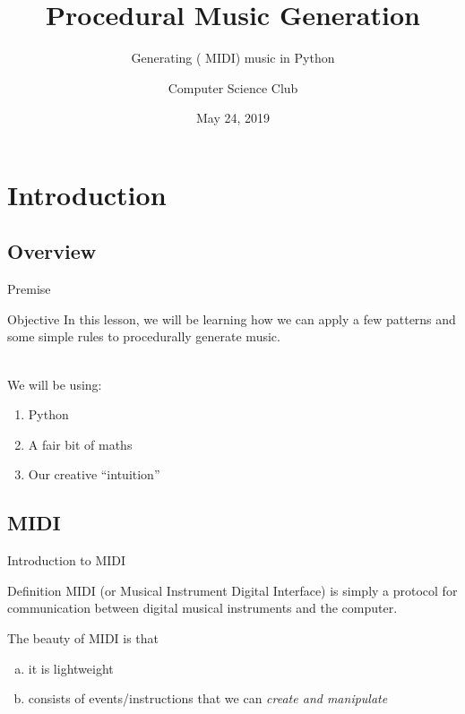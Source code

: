 \documentclass{beamer}
\title{Procedural Music Generation}
\subtitle{Generating (\censor{shitty} MIDI) music in Python}
\institute{Stephen Lewis Secondary School}
\author{Computer Science Club}
\date{May 24, 2019}
\begin{document}
\begin{frame} 
\titlepage 
\end{frame}

\section{Introduction}
\subsection{Overview}
\begin{frame}{Premise}
\end{frame}

\begin{frame}{Objective}
In this lesson, we will be learning how we can apply a few patterns and some simple rules to procedurally generate music.\\~\

We will be using:
\begin{enumerate}
    \item Python
    \item A fair bit of maths
    \item Our creative ``intuition''
\end{enumerate}
\end{frame}

\subsection{MIDI}
\begin{frame}[t]{Introduction to MIDI}
\begin{block}{Definition}
MIDI (or Musical Instrument Digital Interface) is simply a protocol for communication between digital musical instruments and the computer.
\end{block}

The beauty of MIDI is that
\begin{enumerate}[(a)]
    \item it is lightweight
    \item consists of events/instructions that we can \textit{create and manipulate}
\end{enumerate}
\end{frame}
\end{document}

